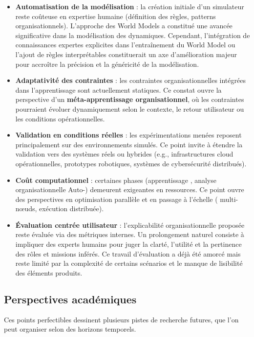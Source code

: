 \begin{itemize}
  \item \textbf{Automatisation de la modélisation} : la création initiale d'un simulateur reste coûteuse en expertise humaine (définition des règles, patterns organisationnels). L'approche des World Models a constitué une avancée significative dans la modélisation des dynamiques. Cependant, l'intégration de connaissances expertes explicites dans l'entraînement du World Model ou l'ajout de règles interprétables constituerait un axe d'amélioration majeur pour accroître la précision et la généricité de la modélisation.
  \item \textbf{Adaptativité des contraintes} : les contraintes organisationnelles intégrées dans l'apprentissage sont actuellement statiques. Ce constat ouvre la perspective d'un \textbf{méta-apprentissage organisationnel}, où les contraintes pourraient évoluer dynamiquement selon le contexte, le retour utilisateur ou les conditions opérationnelles.
  \item \textbf{Validation en conditions réelles} : les expérimentations menées reposent principalement sur des environnements simulés. Ce point invite à étendre la validation vers des systèmes réels ou hybrides (e.g., infrastructures cloud opérationnelles, prototypes robotiques, systèmes de cybersécurité distribués).
  \item \textbf{Coût computationnel} : certaines phases (apprentissage , analyse organisationnelle Auto-) demeurent exigeantes en ressources. Ce point ouvre des perspectives en optimisation parallèle et en passage à l'échelle ( multi-nœuds, exécution distribuée).
  \item \textbf{Évaluation centrée utilisateur} : l'explicabilité organisationnelle proposée reste évaluée via des métriques internes. Un prolongement naturel consiste à impliquer des experts humains pour juger la clarté, l'utilité et la pertinence des rôles et missions inférés. Ce travail d'évaluation a déjà été amorcé mais reste limité par la complexité de certains scénarios et le manque de lisibilité des éléments produits.
\end{itemize}

\subsection*{Perspectives académiques}

Ces points perfectibles dessinent plusieurs pistes de recherche futures, que l'on peut organiser selon des horizons temporels.

